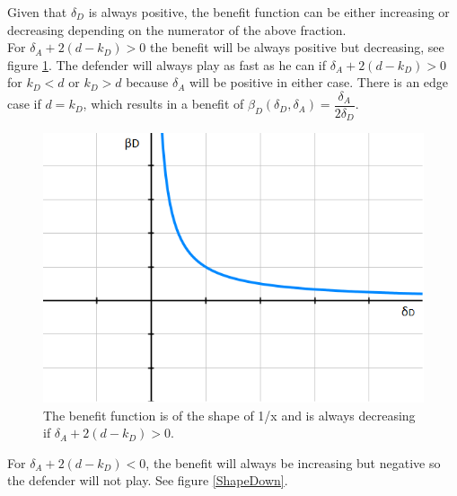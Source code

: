 Given that $\delta_{D}$ is always positive, the benefit function can be either increasing or decreasing depending on the numerator of the above fraction. \\

For $\delta_{A} + 2(d-k_{D}) > 0$ the benefit will be always positive but decreasing, see figure \ref{ShapeUp}. 
The defender will always play as fast as he can if $\delta_{A} + 2(d-k_{D}) > 0$ for $k_{D} < d$ or $k_{D} > d$ because $\delta_{A}$ will be positive in either case. There is an edge case if $d=k_{D}$, which results in a benefit of $\beta_{D}(\delta_{D},\delta_{A})= \dfrac{\delta_{A}}{2\delta_{D}}$. \\
\begin{figure}
\centering
\includegraphics[scale=0.5]{Images/ShapesUp.png} 
\caption{The benefit function is of the shape of 1/x and is always decreasing if $\delta_{A} + 2(d-k_{D}) > 0$. }
\label{ShapeUp}
\end{figure}

For $\delta_{A} + 2(d-k_{D}) < 0$, the benefit will always be increasing but negative so the defender will not play. See figure \ref{ShapeDown}.  \\

